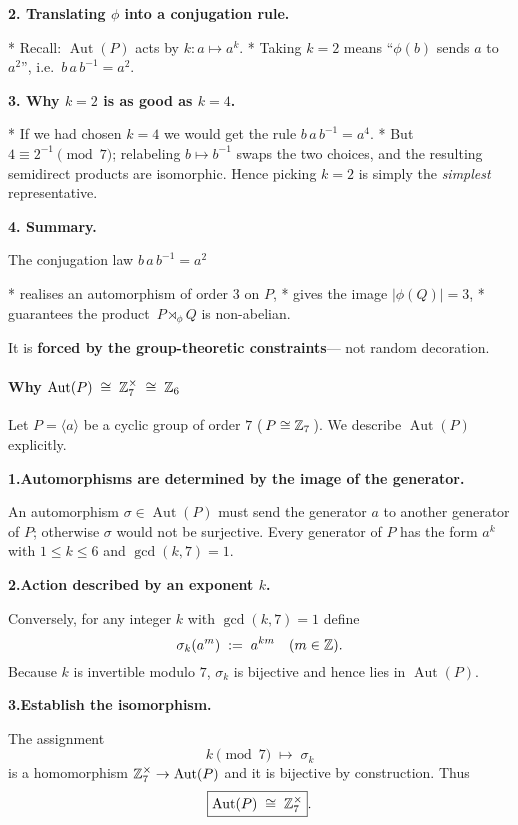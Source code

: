 \documentclass[12pt]{article}
\DeclareMathOperator{\Aut}{Aut}
\theoremstyle{definition} %
\theoremstyle{plain} %
\begin{document}
\medskip
\textbf{2.  Translating $\phi$ into a conjugation rule.}

* Recall: $\Aut(P)$ acts by $k:a\mapsto a^{k}$.
* Taking $k=2$ means “\(\phi(b)\) sends $a$ to $a^{2}$”,
  i.e.\ \(b\,a\,b^{-1}=a^{2}\).

\medskip
\textbf{3.  Why $k=2$ is as good as $k=4$.}

* If we had chosen \(k=4\) we would get the rule
  \(b\,a\,b^{-1}=a^{4}\).  
* But \(4\equiv2^{-1}\pmod 7\); relabeling \(b\mapsto b^{-1}\)
  swaps the two choices, and the resulting semidirect products are
  isomorphic.  
  Hence picking $k=2$ is simply the \emph{simplest} representative.

\medskip
\textbf{4.  Summary.}

The conjugation law \(b\,a\,b^{-1}=a^{2}\)

* realises an automorphism of order \(3\) on \(P\),
* gives the image \(|\phi(Q)|=3\),
* guarantees the product \(\,P\rtimes_{\phi}Q\) is non-abelian.

It is \textbf{forced by the group-theoretic constraints}—
not random decoration.
\paragraph{Why $\displaystyle \Aut(P)\;\cong\;\Bbb Z_{7}^{\times}\;\cong\;\Bbb Z_{6}$}

Let $P=\langle a\rangle$ be a cyclic group of order $7$
(\,$P\cong\Bbb Z_{7}$\,).  We describe \(\Aut(P)\) explicitly.

\smallskip
\textbf{1.\;Automorphisms are determined by the image of the generator.}

An automorphism \(\sigma\in\Aut(P)\) must send the generator \(a\) to
another generator of \(P\); otherwise \(\sigma\) would not be surjective.
Every generator of \(P\) has the form \(a^{k}\) with
\(1\le k\le 6\) and \(\gcd(k,7)=1\).

\smallskip
\textbf{2.\;Action described by an exponent $k$.}

Conversely, for any integer \(k\) with \(\gcd(k,7)=1\)
define
\[
      \sigma_{k}(a^{m}) \;:=\; a^{km}\quad(m\in\Bbb Z).
\]
Because \(k\) is invertible modulo \(7\),
\(\sigma_{k}\) is bijective and hence lies in \(\Aut(P)\).

\smallskip
\textbf{3.\;Establish the isomorphism.}

The assignment
\[
      k\pmod{7}
      \;\longmapsto\; \sigma_{k}
\]
is a homomorphism
\(
      \Bbb Z_{7}^{\times}\to\Aut(P)
\)
and it is bijective by construction.
Thus
\[
      \boxed{\Aut(P)\;\cong\;\Bbb Z_{7}^{\times}}.
\]
\end{document}
